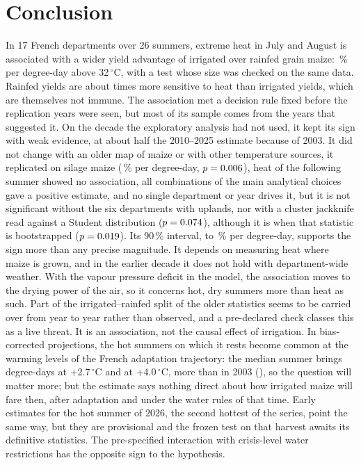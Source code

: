 \section{Conclusion}
\label{sec:conclusion}

In 17 French departments over 26 summers, extreme heat in July and August is associated with a wider yield advantage of irrigated over rainfed grain maize: \QonePct\,\% per degree-day above 32\,$^{\circ}$C, with a test whose size was checked on the same data. Rainfed yields are about \QoneRatio{} times more sensitive to heat than irrigated yields, which are themselves not immune. The association met a decision rule fixed before the replication years were seen, but most of its sample comes from the years that suggested it. On the decade the exploratory analysis had not used, it kept its sign with weak evidence, at about half the 2010--2025 estimate because of 2003. It did not change with an older map of maize or with other temperature sources, it replicated on silage maize (\FodderPct\,\% per degree-day, $p = 0.006$), heat of the following summer showed no association, all \MultiN{} combinations of the main analytical choices gave a positive estimate, and no single department or year drives it, but it is not significant without the six departments with uplands, nor with a cluster jackknife read against a Student distribution ($p = 0.074$), although it is when that statistic is bootstrapped ($p = 0.019$). Its 90\,\% interval, \CiNinetyLow{} to \CiNinetyHigh\,\% per degree-day, supports the sign more than any precise magnitude. It depends on measuring heat where maize is grown, and in the earlier decade it does not hold with department-wide weather. With the vapour pressure deficit in the model, the association moves to the drying power of the air, so it concerns hot, dry summers more than heat as such. Part of the irrigated--rainfed split of the older statistics seems to be carried over from year to year rather than observed, and a pre-declared check classes this as a live threat. It is an association, not the causal effect of irrigation. In bias-corrected projections, the hot summers on which it rests become common at the warming levels of the French adaptation trajectory: the median summer brings \DriasDdTwoSeven{} degree-days at +2.7\,$^{\circ}$C and \DriasDdFour{} at +4.0\,$^{\circ}$C, more than in 2003 (\DriasObsThree), so the question will matter more; but the estimate says nothing direct about how irrigated maize will fare then, after adaptation and under the water rules of that time. Early estimates for the hot summer of 2026, the second hottest of the series, point the same way, but they are provisional and the frozen test on that harvest awaits its definitive statistics. The pre-specified interaction with crisis-level water restrictions has the opposite sign to the hypothesis.

